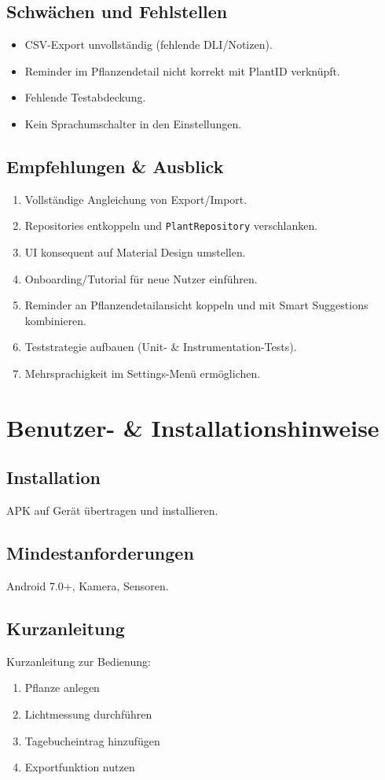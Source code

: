 \documentclass[14pt,a4paper]{report}
\begin{document}
\section{Schwächen und Fehlstellen}
\begin{itemize}
    \item CSV-Export unvollständig (fehlende DLI/Notizen).
    \item Reminder im Pflanzendetail nicht korrekt mit PlantID verknüpft.
    \item Fehlende Testabdeckung.
    \item Kein Sprachumschalter in den Einstellungen.
\end{itemize}

\section{Empfehlungen \& Ausblick}
\begin{enumerate}
    \item Vollständige Angleichung von Export/Import.
    \item Repositories entkoppeln und \texttt{PlantRepository} verschlanken.
    \item UI konsequent auf Material Design umstellen.
    \item Onboarding/Tutorial für neue Nutzer einführen.
    \item Reminder an Pflanzendetailansicht koppeln und mit Smart Suggestions kombinieren.
    \item Teststrategie aufbauen (Unit- \& Instrumentation-Tests).
    \item Mehrsprachigkeit im Settings-Menü ermöglichen.
\end{enumerate}

\chapter{Benutzer- \& Installationshinweise}
\section{Installation}
APK auf Gerät übertragen und installieren.

\section{Mindestanforderungen}
Android 7.0+, Kamera, Sensoren.

\section{Kurzanleitung}
Kurzanleitung zur Bedienung:
\begin{enumerate}
    \item Pflanze anlegen
    \item Lichtmessung durchführen
    \item Tagebucheintrag hinzufügen
    \item Exportfunktion nutzen
\end{enumerate}
\end{document}
